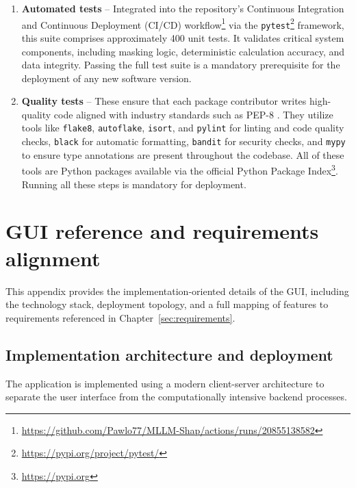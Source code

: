 \begin{appendices}
\begin{enumerate}
    \item \textbf{Automated tests} -- Integrated into the repository's Continuous Integration and Continuous Deployment (CI/CD) workflow\footnote{\url{https://github.com/Pawlo77/MLLM-Shap/actions/runs/20855138582}} via the \texttt{pytest}\footnote{\url{https://pypi.org/project/pytest/}} framework, this suite comprises approximately 400 unit tests. It validates critical system components, including masking logic, deterministic calculation accuracy, and data integrity. Passing the full test suite is a mandatory prerequisite for the deployment of any new software version.

    \item \textbf{Quality tests} -- These ensure that each package contributor writes high-quality code aligned with industry standards such as PEP-8 \parencite{pep8}. They utilize tools like \texttt{flake8}, \texttt{autoflake}, \texttt{isort}, and \texttt{pylint} for linting and code quality checks, \texttt{black} for automatic formatting, \texttt{bandit} for security checks, and \texttt{mypy} to ensure type annotations are present throughout the codebase. All of these tools are Python packages available via the official Python Package Index\footnote{\url{https://pypi.org}}. Running all these steps is mandatory for deployment.
\end{enumerate}

    \chapter{GUI reference and requirements alignment}
    \label{app:gui_reference}

    This appendix provides the implementation-oriented details of the GUI, including the technology stack, deployment topology, and a full mapping of features to requirements referenced in Chapter~\ref{sec:requirements}.

    \section{Implementation architecture and deployment}

    The application is implemented using a modern client-server architecture to separate the user interface from the computationally intensive backend processes.

    \begin{itemize}


\end{itemize}
\end{appendices}

